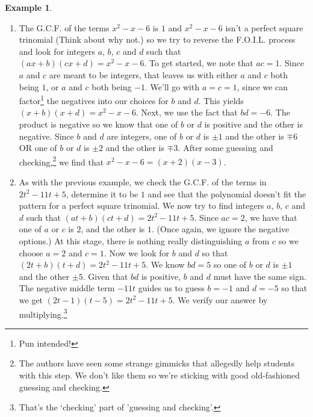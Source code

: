 \documentclass[11pt]{article}
\theoremstyle{definition}  %
\newtheorem{ex}{\bf Example}
\begin{document}
\begin{ex}
\begin{enumerate}
\item  The G.C.F. of the terms $x^2 - x - 6$  is $1$ and $x^2 - x - 6$ isn't a perfect square trinomial (Think about why not.) so we try to reverse the F.O.I.L. process and look for integers $a$, $b$, $c$ and $d$ such that $(ax + b)(cx + d) = x^2 - x - 6$.  To get started, we note that $ac = 1$.  Since $a$ and $c$ are meant to be integers, that leaves us with either $a$ and $c$ both being $1$, or $a$ and $c$ both being $-1$.  We'll go with $a = c = 1$, since we can factor\footnote{Pun intended!} the negatives into our choices for $b$ and $d$.  This yields $(x+b)(x+d) = x^2-x-6$.  Next, we use the fact that $bd = -6$.  The product is negative so we know that one of $b$ or $d$ is positive and the other is negative.  Since $b$ and $d$ are integers, one of $b$ or $d$ is $\pm 1$ and the other is $\mp 6$ OR one of $b$ or $d$ is $\pm 2$ and the other is $\mp 3$. After some guessing and checking,\footnote{The authors have seen some strange gimmicks that allegedly help students with this step.  We don't like them so we're sticking with good old-fashioned guessing and checking.} we find that $x^2 - x - 6 = (x+2)(x-3)$.

\item As with the previous example, we check the G.C.F. of the terms in $2t^2 - 11t + 5$, determine it to be $1$ and see that the polynomial doesn't fit the pattern for a perfect square trinomial.  We now try to find integers $a$, $b$, $c$ and $d$ such that $(at+b)(ct+d) = 2t^2 - 11t + 5$.  Since $ac = 2$, we have that one of $a$ or $c$ is $2$, and the other is $1$. (Once again, we ignore the negative options.)  At this stage, there is nothing really distinguishing $a$ from $c$ so we choose $a = 2$ and $c = 1$.  Now we look for $b$ and $d$ so that $(2t + b)(t+d) = 2t^2 - 11t + 5$.  We know $bd = 5$ so one of $b$ or $d$ is $\pm 1$ and the other $\pm 5$. Given that $bd$ is positive, $b$ and $d$ must have the same sign.  The negative middle term $-11t$ guides us to guess $b = -1$ and $d = -5$ so that we get $(2t -1)(t -5) = 2t^2 - 11t + 5$.  We verify our answer by multiplying.\footnote{That's the `checking' part of 'guessing and checking'.}


\end{enumerate}
\end{ex}
\end{document}
